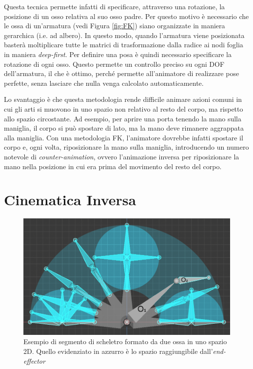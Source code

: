 Questa tecnica permette infatti di specificare, attraverso una rotazione, la posizione di un osso relativa al suo osso padre.
Per questo motivo è necessario che le ossa di un'armatura (vedi Figura \ref{fig:FK}) siano organizzate in maniera gerarchica (i.e. ad albero).
In questo modo, quando l'armatura viene posizionata basterà moltiplicare tutte le matrici di trasformazione dalla radice ai nodi foglia in maniera \emph{deep-first}. 
Per definire una posa è quindi necessario specificare la rotazione di ogni osso. Questo permette un controllo preciso su ogni DOF dell'armatura, il che è ottimo, perché permette all'animatore di realizzare pose perfette, senza lasciare che nulla venga calcolato automaticamente. 

Lo svantaggio è che questa metodologia rende difficile animare azioni comuni in cui gli arti si muovono in uno spazio non relativo al resto del corpo, ma rispetto allo spazio circostante.
Ad esempio, per aprire una porta tenendo la mano sulla maniglia, il corpo si può spostare di lato, ma la mano deve rimanere aggrappata alla maniglia.
Con una metodologia FK, l'animatore dovrebbe infatti spostare il corpo e, ogni volta, riposizionare la mano sulla maniglia, introducendo un numero notevole di \emph{counter-animation}, ovvero l'animazione inversa per riposizionare la mano nella posizione in cui era prima del movimento del resto del corpo.

\section{Cinematica Inversa} \label{sectionIK}

\begin{figure}
\centering
\includegraphics[width=.8\textwidth]{Figures/2Dlinkage}
\decoRule
\caption[Inverse Kinematic 2D]{Esempio di segmento di scheletro formato da due ossa in uno spazio 2D. Quello evidenziato in azzurro è lo spazio raggiungibile dall'\emph{end-effector}}
\label{fig:IK}
\end{figure}

